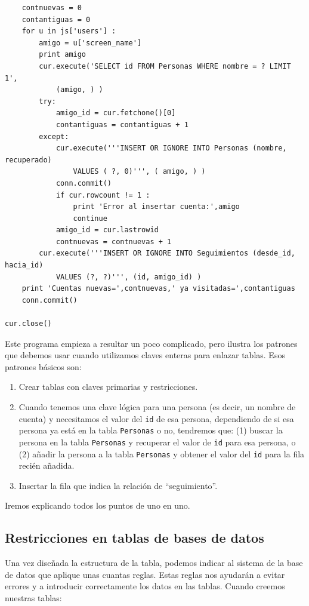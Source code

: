\begin{verbatim}
    contnuevas = 0
    contantiguas = 0
    for u in js['users'] :
        amigo = u['screen_name']
        print amigo
        cur.execute('SELECT id FROM Personas WHERE nombre = ? LIMIT 1', 
            (amigo, ) )
        try:
            amigo_id = cur.fetchone()[0]
            contantiguas = contantiguas + 1
        except:
            cur.execute('''INSERT OR IGNORE INTO Personas (nombre, recuperado) 
                VALUES ( ?, 0)''', ( amigo, ) )
            conn.commit()
            if cur.rowcount != 1 :
                print 'Error al insertar cuenta:',amigo
                continue
            amigo_id = cur.lastrowid
            contnuevas = contnuevas + 1
        cur.execute('''INSERT OR IGNORE INTO Seguimientos (desde_id, hacia_id) 
            VALUES (?, ?)''', (id, amigo_id) )
    print 'Cuentas nuevas=',contnuevas,' ya visitadas=',contantiguas
    conn.commit()

cur.close()
\end{verbatim}
\afterverb
%
Este programa empieza a resultar un poco complicado, pero ilustra
los patrones que debemos usar cuando utilizamos
claves enteras para enlazar tablas. Esos patrones básicos son:

\begin{enumerate}

\item Crear tablas con claves primarias y restricciones.

\item Cuando tenemos una clave lógica para una persona (es decir, un
nombre de cuenta) y necesitamos el valor del {\tt id} de esa persona,
dependiendo de si esa persona ya está en la tabla
{\tt Personas} o no, tendremos que:
(1) buscar la persona en la tabla {\tt Personas} y
recuperar el valor de {\tt id} para esa persona,
o (2) añadir la persona a la tabla {\tt Personas} y obtener el
valor del {\tt id} para la fila recién añadida.

\item Insertar la fila que indica la relación de ``seguimiento''.

\end{enumerate}

Iremos explicando todos los puntos de uno en uno.

\subsection{Restricciones en tablas de bases de datos}

Una vez diseñada la estructura de la tabla, podemos indicar al sistema
de la base de datos que aplique unas cuantas reglas. Estas reglas nos
ayudarán a evitar errores y a introducir correctamente los datos en
las tablas. Cuando creemos nuestras tablas:


